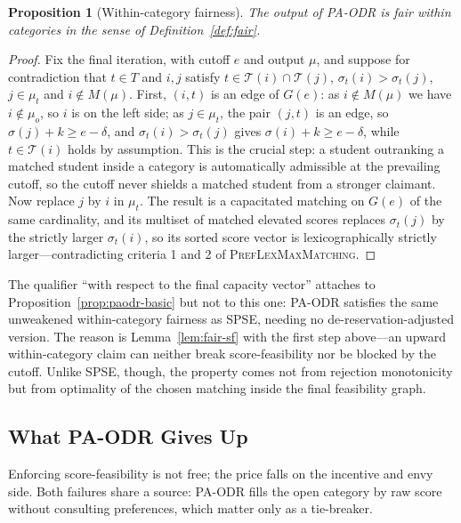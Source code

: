 \documentclass[a4paper,twoside]{article}
\newtheorem{proposition}{Proposition}
\theoremstyle{definition}
\renewcommand{\T}{\mathcal{T}}
\begin{document}
\begin{proposition}[Within-category fairness]
\label{prop:paodr-fair}
The output of PA-ODR is fair within categories in the sense of Definition~\ref{def:fair}.
\end{proposition}

\begin{proof}
Fix the final iteration, with cutoff $e$ and output $\mu$, and suppose for contradiction that $t\in T$ and $i,j$ satisfy $t\in\T(i)\cap\T(j)$, $\sigma_t(i)>\sigma_t(j)$, $j\in\mu_t$ and $i\notin M(\mu)$. First, $(i,t)$ is an edge of $G(e)$: as $i\notin M(\mu)$ we have $i\notin\mu_o$, so $i$ is on the left side; as $j\in\mu_t$, the pair $(j,t)$ is an edge, so $\sigma(j)+k\ge e-\delta$, and $\sigma_t(i)>\sigma_t(j)$ gives $\sigma(i)+k\ge e-\delta$, while $t\in\T(i)$ holds by assumption. This is the crucial step: a student outranking a matched student inside a category is automatically admissible at the prevailing cutoff, so the cutoff never shields a matched student from a stronger claimant. Now replace $j$ by $i$ in $\mu_t$. The result is a capacitated matching on $G(e)$ of the same cardinality, and its multiset of matched elevated scores replaces $\sigma_t(j)$ by the strictly larger $\sigma_t(i)$, so its sorted score vector is lexicographically strictly larger---contradicting criteria 1 and 2 of \textsc{PrefLexMaxMatching}.
\end{proof}

The qualifier ``with respect to the final capacity vector'' attaches to Proposition~\ref{prop:paodr-basic} but not to this one: PA-ODR satisfies the same unweakened within-category fairness as SPSE, needing no de-reservation-adjusted version. The reason is Lemma~\ref{lem:fair-sf} with the first step above---an upward within-category claim can neither break score-feasibility nor be blocked by the cutoff. Unlike SPSE, though, the property comes not from rejection monotonicity but from optimality of the chosen matching inside the final feasibility graph.

\subsection{What PA-ODR Gives Up}
\label{sec:paodr-limits}

Enforcing score-feasibility is not free; the price falls on the incentive and envy side. Both failures share a source: PA-ODR fills the open category by raw score without consulting preferences, which matter only as a tie-breaker.
\end{document}
